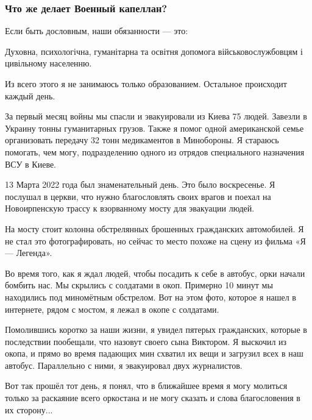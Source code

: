  
 
 
 
 

\subsubsection{Что же делает Военный капеллан?}

Если быть дословным, наши обязанности — это:

\begin{zznagolos}
Духовна, психологічна, гуманітарна та освітня допомога військовослужбовцям і
цивільному населенню.
\end{zznagolos}

Из всего этого я не занимаюсь только образованием. Остальное происходит каждый
день.


За первый месяц войны мы спасли и эвакуировали из Киева 75 людей. Завезли в
Украину тонны гуманитарных грузов. Также я помог одной американской семье
организовать передачу 32 тонн медикаментов в Минобороны. Я стараюсь помогать,
чем могу, подразделению одного из отрядов специального назначения ВСУ в Киеве.

13 Марта 2022 года был знаменательный день. Это было воскресенье. Я послушал в
церкви, что нужно благословлять своих врагов и поехал на Новоирпенскую трассу к
взорванному мосту для эвакуации людей.

На мосту стоит колонна обстрелянных брошенных гражданских автомобилей. Я не
стал это фотографировать, но сейчас то место похоже на сцену из фильма «Я —
Легенда».

Во время того, как я ждал людей, чтобы посадить к себе в автобус, орки начали
бомбить нас. Мы скрылись с солдатами в окоп. Примерно 10 минут мы находились
под миномётным обстрелом. Вот на этом фото, которое я нашел в интернете, рядом
с мостом, я лежал в окопе с солдатами.


Помолившись коротко за наши жизни, я увидел пятерых гражданских, которые в
последствии пообещали, что назовут своего сына Виктором. Я выскочил из окопа, и
прямо во время падающих мин схватил их вещи и загрузил всех в наш автобус.
Параллельно с ними, я эвакуировал двух журналистов.

Вот так прошёл тот день, я понял, что в ближайшее время я могу молиться только
за раскаяние всего оркостана и не могу сказать и слова благословения в их
сторону...
